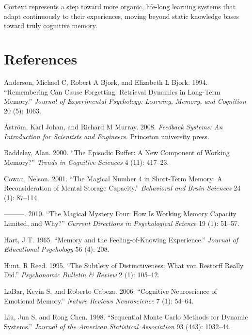 \documentclass[
  letterpaper,
  DIV=11,
  numbers=noendperiod]{scrartcl}
\newlength{\cslhangindent}
\newenvironment{CSLReferences}[2] %
 {\begin{list}{}{%
  \setlength{\itemindent}{0pt}
  \setlength{\leftmargin}{0pt}
  \setlength{\parsep}{0pt}
  \ifodd #1
   \setlength{\leftmargin}{\cslhangindent}
   \setlength{\itemindent}{-1\cslhangindent}
  \fi
  \setlength{\itemsep}{#2\baselineskip}}}
 {\end{list}}
\begin{document}
Cortext represents a step toward more organic, life-long learning
systems that adapt continuously to their experiences, moving beyond
static knowledge bases toward truly cognitive memory.

\section*{References}\label{references}

\label{refs}
\begin{CSLReferences}{1}{0}
Anderson, Michael C, Robert A Bjork, and Elizabeth L Bjork. 1994.
{``Remembering Can Cause Forgetting: Retrieval Dynamics in Long-Term
Memory.''} \emph{Journal of Experimental Psychology: Learning, Memory,
and Cognition} 20 (5): 1063.

Åström, Karl Johan, and Richard M Murray. 2008. \emph{Feedback Systems:
An Introduction for Scientists and Engineers}. Princeton university
press.

Baddeley, Alan. 2000. {``The Episodic Buffer: A New Component of Working
Memory?''} \emph{Trends in Cognitive Sciences} 4 (11): 417--23.

Cowan, Nelson. 2001. {``The Magical Number 4 in Short-Term Memory: A
Reconsideration of Mental Storage Capacity.''} \emph{Behavioral and
Brain Sciences} 24 (1): 87--114.

---------. 2010. {``The Magical Mystery Four: How Is Working Memory
Capacity Limited, and Why?''} \emph{Current Directions in Psychological
Science} 19 (1): 51--57.

Hart, J T. 1965. {``Memory and the Feeling-of-Knowing Experience.''}
\emph{Journal of Educational Psychology} 56 (4): 208.

Hunt, R Reed. 1995. {``The Subtlety of Distinctiveness: What von
Restorff Really Did.''} \emph{Psychonomic Bulletin \& Review} 2 (1):
105--12.

LaBar, Kevin S, and Roberto Cabeza. 2006. {``Cognitive Neuroscience of
Emotional Memory.''} \emph{Nature Reviews Neuroscience} 7 (1): 54--64.

Liu, Jun S, and Rong Chen. 1998. {``Sequential Monte Carlo Methods for
Dynamic Systems.''} \emph{Journal of the American Statistical
Association} 93 (443): 1032--44.


\end{CSLReferences}
\end{document}
